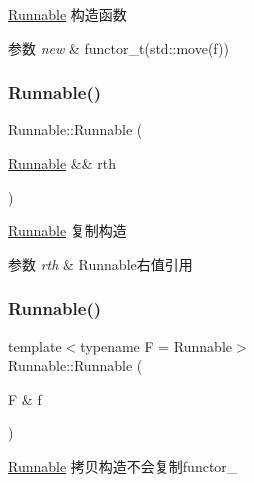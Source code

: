 \hyperlink{classRunnable}{Runnable} 构造函数 


\begin{DoxyParams}{参数}
{\em new} & functor\+\_\+t(std\+::move(f)) \\
\hline
\end{DoxyParams}
\mbox{\label{classRunnable_ab2054720a62d059c59d0e8085d3be78e}} 
\subsubsection{\texorpdfstring{Runnable()}{Runnable()}\hspace{0.1cm}{\footnotesize\ttfamily [2/3]}}
{\footnotesize\ttfamily Runnable\+::\+Runnable (\begin{DoxyParamCaption}\item[{\hyperlink{classRunnable}{Runnable} \&\&}]{rth }\end{DoxyParamCaption})\hspace{0.3cm}{\ttfamily [inline]}}



\hyperlink{classRunnable}{Runnable} 复制构造 


\begin{DoxyParams}{参数}
{\em rth} & Runnable右值引用 \\
\hline
\end{DoxyParams}
\mbox{\label{classRunnable_aaac34b8a861ab506499f8ec791e7cc16}} 
\subsubsection{\texorpdfstring{Runnable()}{Runnable()}\hspace{0.1cm}{\footnotesize\ttfamily [3/3]}}
{\footnotesize\ttfamily template$<$typename F  = Runnable$>$ \\
Runnable\+::\+Runnable (\begin{DoxyParamCaption}\item[{F \&}]{f }\end{DoxyParamCaption})\hspace{0.3cm}{\ttfamily [inline]}}



\hyperlink{classRunnable}{Runnable} 拷贝构造不会复制functor\+\_\+ 


